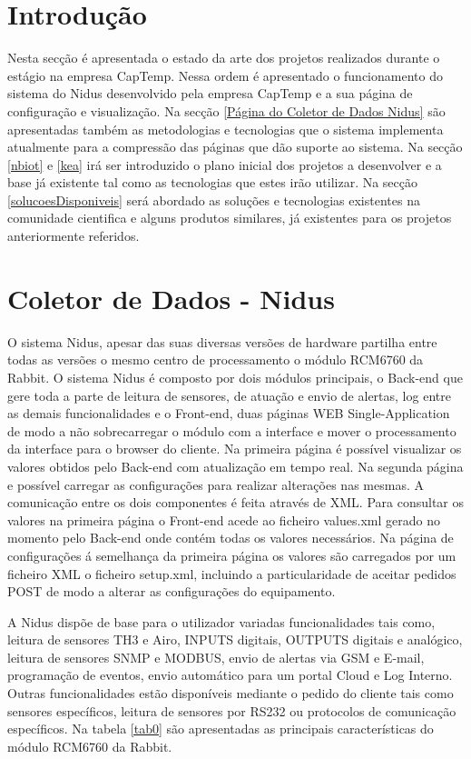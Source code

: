 
\section{Introdução}
Nesta secção é apresentada o estado da arte dos projetos realizados durante o estágio na empresa CapTemp. Nessa ordem é apresentado o funcionamento do sistema do Nidus desenvolvido pela empresa CapTemp e a sua página de configuração e visualização. Na secção \ref{Página do Coletor de Dados Nidus} são apresentadas também as metodologias e tecnologias que o sistema implementa atualmente para a compressão das páginas que dão suporte ao sistema. Na secção \ref{nbiot} e \ref{kea} irá ser introduzido o plano inicial dos projetos a desenvolver e a base já existente tal como as tecnologias que estes irão utilizar. Na secção \ref{solucoesDisponiveis} será abordado as soluções e tecnologias existentes na comunidade cientifica e alguns produtos similares, já existentes para os projetos anteriormente referidos.

\section{Coletor de Dados  - Nidus} \label{Coletor de Dados - Nidus}
\par
O sistema Nidus, apesar das suas diversas versões de hardware partilha entre todas as versões o mesmo centro de processamento o módulo RCM6760 da Rabbit. O sistema Nidus é composto por dois módulos principais, o Back-end que gere toda a parte de leitura de sensores, de atuação e envio de alertas, log entre as demais funcionalidades e o Front-end, duas páginas WEB Single-Application de modo a não sobrecarregar o módulo com a interface e mover o processamento da interface para o browser do cliente. Na primeira página é possível visualizar os valores obtidos pelo Back-end com atualização em tempo real. Na segunda página e possível carregar as configurações para realizar alterações nas mesmas. A comunicação entre os dois componentes é feita através de XML. Para consultar os valores na primeira página o Front-end acede ao ficheiro values.xml gerado no momento pelo Back-end onde contém todas os valores necessários. Na página de configurações á semelhança da primeira página os valores são carregados por um ficheiro XML o ficheiro setup.xml, incluindo a particularidade de aceitar pedidos POST de modo a alterar as configurações do equipamento.
\par A Nidus dispõe de base para o utilizador variadas funcionalidades tais como, leitura de sensores TH3 e Airo, INPUTS digitais, OUTPUTS digitais e analógico, leitura de sensores SNMP e MODBUS, envio de alertas via GSM e E-mail, programação de eventos, envio automático para um portal Cloud e Log Interno. Outras funcionalidades estão disponíveis mediante o pedido do cliente tais como sensores específicos, leitura de sensores por RS232 ou protocolos de comunicação específicos.
Na tabela \ref{tab0} são apresentadas as principais características do módulo RCM6760 da Rabbit.



